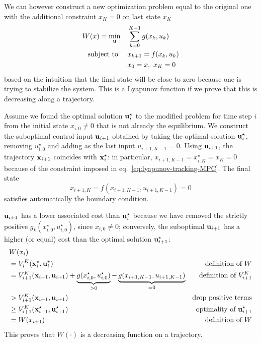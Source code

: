 We can however construct a new optimization problem equal to the original one with the additional constraint $x_K=0$ on last state $x_K$
\begin{equation}
  \label{eq:lyapunov-tracking-MPC}
  \begin{aligned}
    W(x) = \min_{\boldsymbol{\mathrm{u}}} &\quad \sum_{k=0}^{K-1} g(x_k,u_k) \\
    \text{subject to } &\quad x_{k+1} = f(x_k,u_k) \\
                                            &\quad  x_0 = x,\ x_K = 0
  \end{aligned}
\end{equation}
based on the intuition that the final state will be close to zero because one is trying to stabilize the system. This is a Lyapunov function if we prove that this is decreasing along a trajectory.

Assume we found the optimal solution $\boldsymbol{\mathrm{u}}_i^\star$ to the modified problem for time step $i$ from the initial state $x_{i,0}\neq 0$ that is not already the equilibrium. We construct the suboptimal control input $\boldsymbol{\mathrm{u}}_{i+1}$ obtained by taking the optimal solution $\boldsymbol{\mathrm{u}}_i^\star$, removing $u_{i,0}^\star$ and adding as the last input $u_{i+1,K-1} = 0$. Using $\boldsymbol{\mathrm{u}}_{i+1}$, the trajectory $\boldsymbol{\mathrm{x}}_{i+1}$ coincides with $\boldsymbol{\mathrm{x}}_i^\star$: in particular, $x_{i+1,K-1}=x_{i,K}^\star=x_K=0$ because of the constraint imposed in eq.~\eqref{eq:lyapunov-tracking-MPC}. The final state
\begin{equation*}
  x_{i+1,K} = f(x_{i+1,K-1},u_{i+1,K-1}) = 0
\end{equation*}
satisfies automatically the boundary condition.

$\boldsymbol{\mathrm{u}}_{i+1}$ has a lower associated cost than $\boldsymbol{\mathrm{u}}_i^\star$ because we have removed the strictly positive $g_k(x_{i,0}^\star,u_{i,0}^\star)$, since $x_{i,0}\neq 0$; conversely, the suboptimal $\boldsymbol{\mathrm{u}}_{i+1}$ has a higher (or equal) cost than the optimal solution $\boldsymbol{\mathrm{u}}_{i+1}^\star$:
\begin{align*}
  & W(x_i) \\
  & = V_i^K(\boldsymbol{\mathrm{x}}_i^\star, \boldsymbol{\mathrm{u}}_i^\star) & \text{definition of $W$} \\
  & = V_{i+1}^K(\boldsymbol{\mathrm{x}}_{i+1}, \boldsymbol{\mathrm{u}}_{i+1}) + \underbrace{g(x_{i,0}^\star,u_{i,0}^\star)}_{>0} - \underbrace{g(x_{i+1,K-1},u_{i+1,K-1})}_{=0} & \text{definition of $V_{i+1}^K$} \\
  & > V_{i+1}^K(\boldsymbol{\mathrm{x}}_{i+1}, \boldsymbol{\mathrm{u}}_{i+1}) & \text{drop positive terms} \\
  & \geq V_{i+1}^K(\boldsymbol{\mathrm{x}}_{i+1}^\star, \boldsymbol{\mathrm{u}}_{i+1}^\star) & \text{optimality of $\boldsymbol{\mathrm{u}}_{i+1}^\star$} \\
  & = W(x_{i+1}) & \text{definition of $W$}
\end{align*}
This proves that $W(\cdot)$ is a decreasing function on a trajectory.

